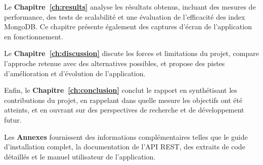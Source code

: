 Le \textbf{Chapitre~\ref{ch:results}} analyse les résultats obtenus, incluant des mesures de performance, des tests de scalabilité et une évaluation de l'efficacité des index MongoDB. Ce chapitre présente également des captures d'écran de l'application en fonctionnement.

Le \textbf{Chapitre~\ref{ch:discussion}} discute les forces et limitations du projet, compare l'approche retenue avec des alternatives possibles, et propose des pistes d'amélioration et d'évolution de l'application.

Enfin, le \textbf{Chapitre~\ref{ch:conclusion}} conclut le rapport en synthétisant les contributions du projet, en rappelant dans quelle mesure les objectifs ont été atteints, et en ouvrant sur des perspectives de recherche et de développement futur.

Les \textbf{Annexes} fournissent des informations complémentaires telles que le guide d'installation complet, la documentation de l'API REST, des extraits de code détaillés et le manuel utilisateur de l'application.

